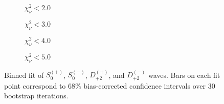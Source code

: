 \begin{figure}[htbp]
    \centering
    \begin{subfigure}{0.45\textwidth}
        
        \caption{$\chi^2_\nu < 2.0$}
    \end{subfigure}
    \hfill
    \begin{subfigure}{0.45\textwidth}
        
        \caption{$\chi^2_\nu < 3.0$}
    \end{subfigure}
    \vspace{1em}
    \begin{subfigure}{0.45\textwidth}
        
        \caption{$\chi^2_\nu < 4.0$}
    \end{subfigure}
    \hfill
    \begin{subfigure}{0.45\textwidth}
        
        \caption{$\chi^2_\nu < 5.0$}
    \end{subfigure}

    \caption{Binned fit of $S_{0}^{(+)}$, $S_{0}^{(-)}$, $D_{+2}^{(+)}$, and $D_{+2}^{(-)}$ waves. Bars on each fit point correspond to $68\%$ bias-corrected confidence intervals over $ 30 $ bootstrap iterations.}
    \label{fig:binned-fit-all-Spn-D2pn}
\end{figure}



